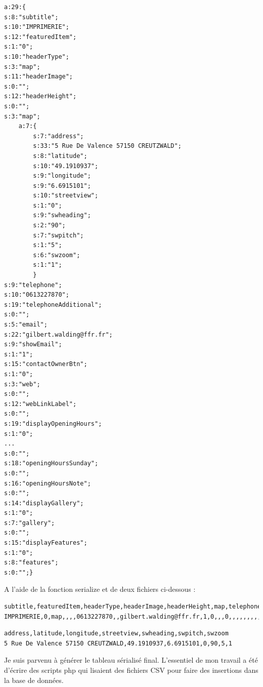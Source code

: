 \documentclass[report]{tnreport}
\begin{document}
\clearpage


\begin{lstlisting}[caption={Tableau sérialisé}, label={lst:serializedTab}]
a:29:{
s:8:"subtitle";
s:10:"IMPRIMERIE";
s:12:"featuredItem";
s:1:"0";
s:10:"headerType";
s:3:"map";
s:11:"headerImage";
s:0:"";
s:12:"headerHeight";
s:0:"";
s:3:"map";
	a:7:{
		s:7:"address";
		s:33:"5 Rue De Valence 57150 CREUTZWALD";
		s:8:"latitude";
		s:10:"49.1910937";
		s:9:"longitude";
		s:9:"6.6915101";
		s:10:"streetview";
		s:1:"0";
		s:9:"swheading";
		s:2:"90";
		s:7:"swpitch";
		s:1:"5";
		s:6:"swzoom";
		s:1:"1";
		}
s:9:"telephone";
s:10:"0613227870";
s:19:"telephoneAdditional";
s:0:"";
s:5:"email";
s:22:"gilbert.walding@ffr.fr";
s:9:"showEmail";
s:1:"1";
s:15:"contactOwnerBtn";
s:1:"0";
s:3:"web";
s:0:"";
s:12:"webLinkLabel";
s:0:"";
s:19:"displayOpeningHours";
s:1:"0";
...
s:0:"";
s:18:"openingHoursSunday";
s:0:"";
s:16:"openingHoursNote";
s:0:"";
s:14:"displayGallery";
s:1:"0";
s:7:"gallery";
s:0:"";
s:15:"displayFeatures";
s:1:"0";
s:8:"features";
s:0:"";}
\end{lstlisting}

A l’aide de la fonction serialize et de deux fichiers ci-dessous :


\begin{lstlisting}[caption={Premier CSV en entrée de mon script}, label={lst:firstEntry}]
subtitle,featuredItem,headerType,headerImage,headerHeight,map,telephone,telephoneAdditional,email,showEmail,contactOwnerBtn,web,webLinkLabel,displayOpeningHours,openingHoursMonday,openingHoursTuesday,openingHoursWednesday,openingHoursThursday,openingHoursFriday,openingHoursSaturday,openingHoursSunday,openingHoursNote,displaySocialIcons,socialIconsOpenInNewWindow,socialIcons,displayGallery,gallery,displayFeatures,features
IMPRIMERIE,0,map,,,,0613227870,,gilbert.walding@ffr.fr,1,0,,,0,,,,,,,,,0,1,,0,,0,

\end{lstlisting}

\begin{lstlisting}[caption={Deuxième CSV en entrée de mon script}, label={lst:secondEntry}]
address,latitude,longitude,streetview,swheading,swpitch,swzoom
5 Rue De Valence 57150 CREUTZWALD,49.1910937,6.6915101,0,90,5,1
\end{lstlisting}

Je suis parvenu à générer le tableau sérialisé final. L’essentiel de mon travail a été d’écrire des scripts php qui lisaient des fichiers CSV pour faire des insertions dans la base de données.
\end{document}
